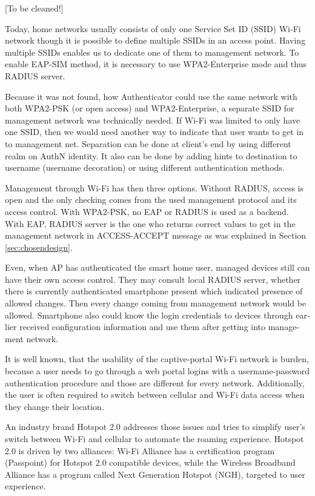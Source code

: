 \documentclass[12pt,a4paper,english]{tutthesis}
\begin{document}
\begin{otherlanguage}{english}
[To be cleaned!]

Today, home networks usually consists of only one Service Set ID (SSID)
Wi-Fi network though it is possible to define multiple SSIDs in
an access point. Having multiple SSIDs enables us to dedicate one of them
to management network. 
To enable EAP-SIM method, it is necessary to use WPA2-Enterprise mode
and thus RADIUS server.


Because it was not found, how Authenticator could use the same network
with both WPA2-PSK (or open access) and WPA2-Enterprise, a
separate SSID for management network was technically needed.
If Wi-Fi was limited to only have one SSID, then we would need another
way to indicate that user wants to get in to management net. 
Separation can be done at client's  end by using different realm on
AuthN identity. It also can be done by adding hints to destination to
username (username decoration) or using different authentication
methods. 

Management through Wi-Fi has then three
options.  Without RADIUS, access is open and the only checking comes
from the used management protocol and its access control.
With WPA2-PSK,  no EAP or RADIUS is used as a backend.  With EAP,
RADIUS server is the one who returns correct values to get in the
management network in ACCESS-ACCEPT message as was
explained in Section \ref{sec:chosendesign}.

Even, when AP has authenticated the smart home user, managed devices still 
can have their own access control.
They may consult local RADIUS server, whether there is currently
authenticated smartphone present which indicated presence of 
allowed changes. Then every change coming from management network
would be allowed. Smartphone also could know the login credentials to
devices through earlier received configuration information and use
them after getting into management network.







It is well known, that the usability of the captive-portal Wi-Fi
 network is burden, because a user needs to go through 
a web portal logins with a username-password authentication 
procedure and those are different for every network.
Additionally, the user is often required to switch 
between cellular and  Wi-Fi data access when they change their location.

An industry brand  Hotspot 2.0 addresses those issues and tries to
simplify user's switch between Wi-Fi and cellular to automate the
roaming experience.  Hotspot 2.0 is driven by two alliances:
Wi-Fi Alliance has a certification program (Passpoint)
for Hotspot 2.0 compatible devices, while the Wireless Broadband
Alliance has a program called Next Generation Hotspot (NGH), targeted
to user experience\cite{wba-ngh}.


\end{otherlanguage}
\end{document}
